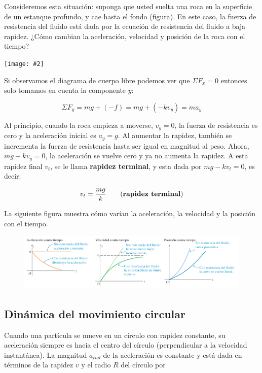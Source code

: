 \documentclass{article}
\newcommand{\newsubsection}[1]{
    \vspace{0.5cm}
    \color{sectionColor}
    \subsection{\bl{#1}}
    \color{black}
    \vspace{0.5cm}
}
\newcommand{\bl}[1]{\textbf{#1}}
\newcommand{\ladoALado}[4]{
    \begin{minipage}[t]{#3\textwidth}
        \vspace{0pt}
        #1
    \end{minipage}
    \hfill
    \begin{minipage}[t]{#4\textwidth}
        \vspace{0pt}
        \centering
        \texttt{[image: \#2]}
    \end{minipage}
}
\begin{document}
    \ladoALado{
        \par Consideremos esta situación: suponga que usted suelta una roca en la superficie de un estanque profundo, y cae hasta el fondo (figura). En este caso, la fuerza de resistencia del fluido está dada por la ecuación de resistencia del fluido a baja rapidez. ¿Cómo cambian la aceleración, velocidad y posición de la roca con el tiempo?
    }{img/3.3-6.png}{0.6}{0.4}

    \par Si observamos el diagrama de cuerpo libre podemos ver que $\Sigma F_x = 0$ entonces solo tomamos en cuenta la componente $y$:

    \[ \Sigma F_y = mg + (-f) = mg + (-kv_y) = ma_y \]

    \par Al principio, cuando la roca empieza a moverse, $v_y = 0$, la fuerza de resistencia es cero y la aceleración inicial es $a_y = g$. Al aumentar la rapidez, también se incrementa la fuerza de resistencia hasta ser igual en magnitud al peso. Ahora, $mg - kv_y = 0$, la aceleración se vuelve cero y ya no aumenta la rapidez. A esta rapidez final $v_t$, se le llama \bl{rapidez terminal}, y esta dada por $mg - kv_t = 0$, es decir:

    \[ v_t = \frac{mg}{k} \quad \quad \text{(\bl{rapidez terminal})} \]

    \par La siguiente figura muestra cómo varían la aceleración, la velocidad y la posición con el tiempo.

    \begin{figure}[H]
        \centering
        \includegraphics[width=\textwidth]{img/3.3-7.png}
    \end{figure}

    \newsubsection{Dinámica del movimiento circular}

    \par Cuando una partícula se mueve en un círculo con rapidez constante, su aceleración siempre es hacia el centro del círculo (perpendicular a la velocidad instantánea). La magnitud $a_{rad}$ de la aceleración es constante y está dada en términos de la rapidez $v$ y el radio $R$ del círculo por
\end{document}
